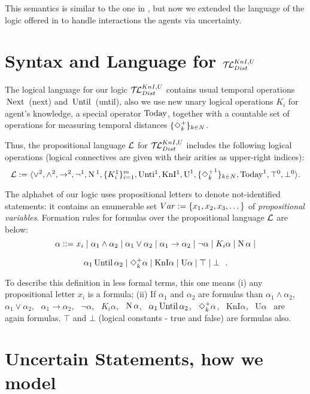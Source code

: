 \documentclass[runningheads]{llncs}
\begin{document}
This semantics is similar to the one in
 \cite{vris}, but now we extended the language of the logic offered in
\cite{vris} to handle interactions the agents via uncertainty.




 \section{Syntax and  Language for $\mathcal{T\!L}^{KnI,U}_{Dist}$}

The logical language for our logic  $\mathcal{T\!L}^{KnI,U}_{Dist}$  contains usual temporal
operations $\,\mathrm{Next}\,$ (next) and $\,\mathrm{Until}\,$ (until), also we use new unary
logical operations $K_i$ for agent's knowledge, a special operator
$\mathrm{Today}$, together with a countable set of operations for measuring
temporal distances $\{\Diamond^+_k\}_{k\in N}$.


Thus, the propositional language $\mathcal{L}$ for $\mathcal{T\!L}^{KnI,U}_{Dist}$ includes the
following logical operations (logical connectives are given with
their arities as upper-right indices):
$$
\mathcal{L}:=\langle
\vee^2,\wedge^2,\to^2,\neg^1,
\mathrm{N}\,^1,
\{K^1_i\}_{i=1}^m, \mbox{Unti$^1$},
\mbox{KnI$^1$}, \mbox{U}^1,
\{{\Diamond^+_k}^1\}_{k\in N},
\mathrm{Today}^1,
\top^0,\bot^0\rangle
.$$

The alphabet of our logic uses propositional letters to denote not-identified statements: it  contains an enumerable set
 $\mathop{Var}:=\{x_1,x_2,x_3,\dots\}$ of
 \emph{propositional variables}.
Formation rules for
 formulas over the propositional language $\mathcal{L}$
are below:
$$
  \alpha
  ::=
  x_i\mathrel{|}
  \alpha_1\wedge\alpha_2\mathrel{|}
  \alpha_1\vee\alpha_2\mathrel{|}
  \alpha_1\to\alpha_2\mathrel{|}
  \neg\alpha\mathrel{|}
  K_i\alpha\mathrel{|}
  \mathrm{N}\,\alpha\mathrel{|}  $$

  $$  \alpha_1\,\mathrm{Until}\,\alpha_2\mathrel{|}
  \Diamond^+_k\alpha\mathrel{|} \mbox{KnI}\alpha \mathrel{|} \mbox{U}\alpha \mathrel{|}
  \top\mathrel{|}
  \bot \ \ . $$

To describe this definition in less formal terms, this one means
(i) any propositional letter $x_i$ is a formula;
(ii) If $ \alpha_1$ and $\alpha_2$ are formulas than
$\alpha_1\wedge\alpha_2$, \
$\alpha_1\vee\alpha_2$, \
$\alpha_1\to\alpha_2$, \
    $ \neg\alpha$, \
    $K_i\alpha$, \
    $\mathrm{N}\,\alpha$, \
  $\alpha_1\,\mathrm{Until}\,\alpha_2$, \
    $\Diamond^+_k\alpha$, \
    $\mbox{KnI}\alpha$, \
    $ \mbox{U}\alpha$ \
    are again formulas.  $\top$ and $\bot$ (logical constants - true and false)
    are  formulas also.

\medskip

\section{Uncertain Statements, how we model}
\end{document}
